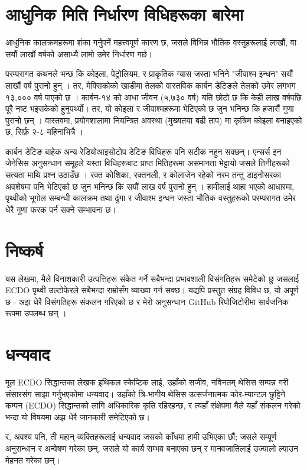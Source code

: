 \documentclass[10pt,twocolumn,letterpaper]{article}
\begin{document}
\section{आधुनिक मिति निर्धारण विधिहरूका बारेमा}

आधुनिक कालक्रमहरूमा शंका गर्नुपर्ने महत्त्वपूर्ण कारण छ, जसले विभिन्न भौतिक वस्तुहरूलाई लाखौं, वा सयौं लाखौं वर्षको असाध्यै लामो उमेर निर्धारण गर्छ।

परम्परागत कथनले भन्छ कि कोइला, पेट्रोलियम, र प्राकृतिक ग्यास जस्ता भनिने "जीवाश्म इन्धन" सयौं लाखौं वर्ष पुरानो हुन् \cite{104}। तर, मेक्सिकोको खाडीमा तेलको वास्तविक कार्बन डेटिङले तेलको उमेर लगभग १३,००० वर्ष पाएको छ \cite{105}। कार्बन-१४ को आधा जीवन (५,७३० वर्ष) यति छोटो छ कि केही लाख वर्षपछि पूरै नष्ट भइसकेको हुनुपर्थ्यो। तर, यो कोइला र जीवाश्‍महरूमा भेटिएको छ जुन भनिन्छ कि हजारौं गुणा पुरानो छन् \cite{106}। वास्तवमा, प्रयोगशालामा नियन्त्रित अवस्था (मुख्यतया बढी ताप) मा कृत्रिम कोइला बनाइएको छ, सिर्फ़ २-८ महिनाभित्रै \cite{107}।

कार्बन डेटिङ बाहेक अन्य रेडियोआइसोटोप डेटिङ विधिहरू पनि सटीक नहुन सक्छन्। एन्सर्स इन जेनेसिस अनुसन्धान समूहले यस्ता विधिहरूबाट प्राप्त मितिहरूमा असमानता भेट्टायो जसले तिनीहरूको सत्यता माथि प्रश्न उठाउँछ \cite{108}। रक्त कोशिका, रक्तनली, र कोलाजेन रहेको नरम तन्तु डाइनोसरका अवशेषमा पनि भेटिएको छ जुन भनिन्छ कि सयौं लाख वर्ष पुरानो हुन् \cite{109,110}। हामीलाई थाहा भएको आधारमा, पृथ्वीको भूगोल सम्बन्धी कालक्रम तथा ढुंगा र जीवाश्म इन्धन जस्ता भौतिक वस्तुहरूको परम्परागत उमेर धेरै गुणा फरक पर्न सक्ने सम्भावना छ।

\section{निष्कर्ष}

यस लेखमा, मैले विनाशकारी उत्पत्तिहरू संकेत गर्ने सबैभन्दा प्रभावशाली विसंगतिहरू समेटेको छु जसलाई ECDO पृथ्वी उल्टोफेरले सबैभन्दा राम्रोसँग व्याख्या गर्न सक्छ। यद्यपि प्रस्तुत संग्रह विविध छ, यो अपूर्ण छ - अझ धेरै विसंगतिहरू संकलन गरिएको छ र मेरो अनुसन्धान GitHub रिपोजिटोरीमा सार्वजनिक रूपमा उपलब्ध छन् \cite{2}।
\section{धन्यवाद}

मूल ECDO सिद्धान्तका लेखक इथिकल स्केप्टिक लाई, उहाँको सजीव, नविनतम् थेसिस सम्पन्न गरी संसारसंग साझा गर्नुभएकोमा धन्यवाद। उहाँको त्रि-भागीय थेसिस \cite{1} उत्सर्जनात्मक कोर-म्यान्टल छुट्टिने कम्पन (ECDO) सिद्धान्तको लागि अधिकारिक कृति रहिरहन्छ, र त्यहाँ संक्षेपमा मैले यहाँ संकलन गरेको भन्दा यो विषयमा अझ धेरै जानकारी समेटिएको छ।

र, अवश्य पनि, ती महान् व्यक्तिहरूलाई धन्यवाद जसको काँधमा हामी उभिएका छौं; जसले सम्पूर्ण अनुसन्धान र अन्वेषण गरेका छन्, जसले यो कार्य सम्भव बनाएका छन् र मानवजातिलाई उज्यालो ल्याउन मेहनत गरेका छन्।

\clearpage
\twocolumn
{\small


}
\end{document}
